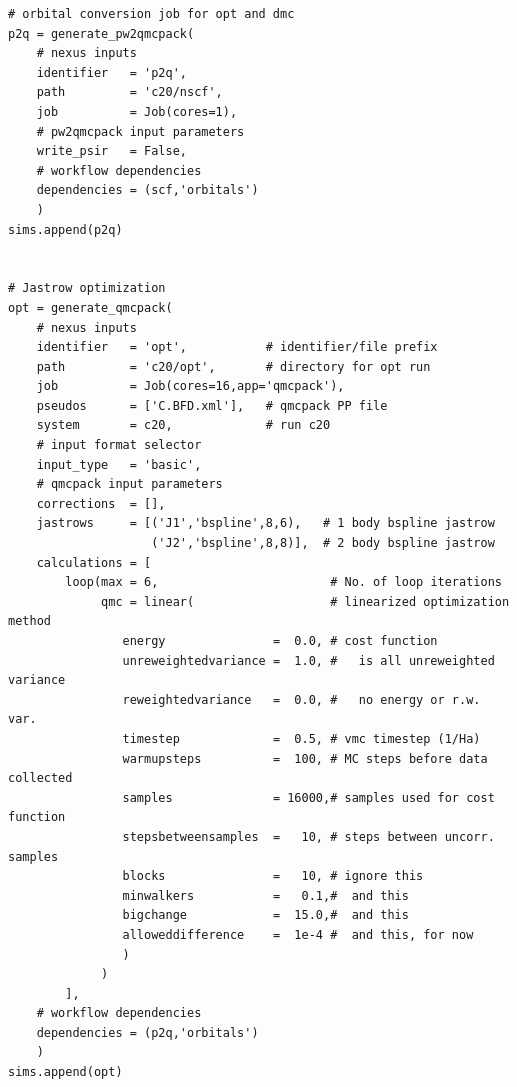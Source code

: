 \documentclass[oneside,11pt]{memoir}
\numberwithin{equation}{section}
\begin{document}
\begin{verbatim}
# orbital conversion job for opt and dmc
p2q = generate_pw2qmcpack(
    # nexus inputs
    identifier   = 'p2q',
    path         = 'c20/nscf',
    job          = Job(cores=1),
    # pw2qmcpack input parameters
    write_psir   = False,
    # workflow dependencies
    dependencies = (scf,'orbitals')
    )
sims.append(p2q)


# Jastrow optimization
opt = generate_qmcpack(
    # nexus inputs
    identifier   = 'opt',           # identifier/file prefix
    path         = 'c20/opt',       # directory for opt run
    job          = Job(cores=16,app='qmcpack'),
    pseudos      = ['C.BFD.xml'],   # qmcpack PP file
    system       = c20,             # run c20
    # input format selector   
    input_type   = 'basic',
    # qmcpack input parameters
    corrections  = [], 
    jastrows     = [('J1','bspline',8,6),   # 1 body bspline jastrow
                    ('J2','bspline',8,8)],  # 2 body bspline jastrow
    calculations = [
        loop(max = 6,                        # No. of loop iterations
             qmc = linear(                   # linearized optimization method
                energy               =  0.0, # cost function
                unreweightedvariance =  1.0, #   is all unreweighted variance
                reweightedvariance   =  0.0, #   no energy or r.w. var. 
                timestep             =  0.5, # vmc timestep (1/Ha)
                warmupsteps          =  100, # MC steps before data collected 
                samples              = 16000,# samples used for cost function 
                stepsbetweensamples  =   10, # steps between uncorr. samples
                blocks               =   10, # ignore this  
                minwalkers           =   0.1,#  and this
                bigchange            =  15.0,#  and this
                alloweddifference    =  1e-4 #  and this, for now
                )
             )        
        ],
    # workflow dependencies
    dependencies = (p2q,'orbitals')        
    )
sims.append(opt)


\end{verbatim}
\end{document}

